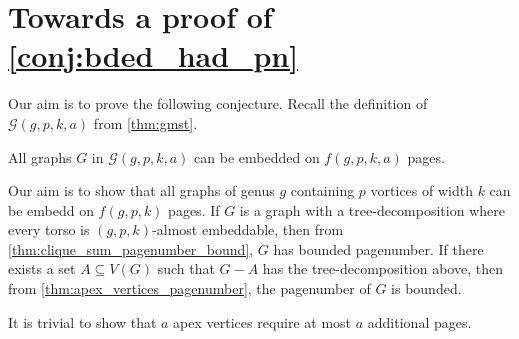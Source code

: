 
\newcommand{\gpk}{12gpk + 12gp + 18g + 12kp + 12p + 11}
\chapter{Towards a proof of \cref{conj:bded_had_pn}}\label{chap:Proving_The_Theorem}
Our aim is to prove the following conjecture. Recall the definition of $\mathcal{G}(g, p, k, a)$ from \cref{thm:gmst}. 
\begin{conjecture}\label{conj:gmst_conjecture_pagenumber}
	All graphs $G$ in $\mathcal{G}(g, p, k, a)$ can be embedded on \(f(g, p, k, a)\) pages.
\end{conjecture}
Our aim is to show that all graphs of genus \(g\) containing \(p\) vortices of width \(k\) can be embedd on \(f(g, p, k)\) pages. If $G$ is a graph with a tree-decomposition where every torso is $(g, p, k)$-almost embeddable, then from \cref{thm:clique_sum_pagenumber_bound}, $G$ has bounded pagenumber. If there exists a set $A \subseteq V(G)$ such that $G - A$ has the tree-decomposition above, then from \cref{thm:apex_vertices_pagenumber}, the pagenumber of $G$ is bounded.

It is trivial to show that $a$ apex vertices require at most $a$ additional pages.











